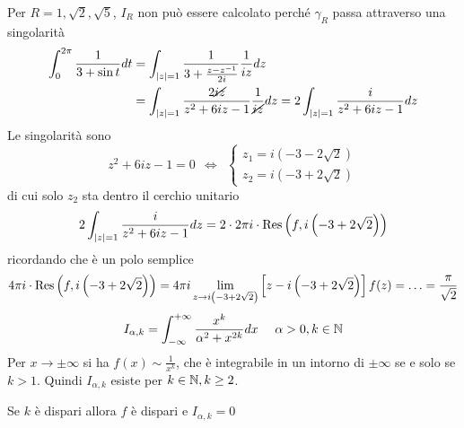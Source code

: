 Per $R = 1, \sqrt{2}, \sqrt{5}$, $I_{R}$ non può essere calcolato perché $\gamma_{R}$ passa attraverso una singolarità
\Soluzione
\begin{align*}
\int^{2\pi}_{0}\frac{1}{3 + \sin t} dt & = \int_{\left| z\right| = 1}\frac{1}{3 + \frac{z - z^{- 1}}{2i}}\frac{1}{iz} dz\\
 & = \int_{\left| z\right| = 1}\frac{2\cancel{iz}}{z^{2} + 6iz - 1}\frac{1}{\cancel{iz}} dz = 2\int_{\left| z\right| = 1}\frac{i}{z^{2} + 6iz - 1} dz
\end{align*}
Le singolarità sono
\begin{equation*}
z^{2} + 6iz - 1 = 0\ \ \iff \ \
\begin{cases}
z_{1} = i\left(- 3 - 2\sqrt{2}\right)\\
z_{2} = i\left(- 3 + 2\sqrt{2}\right)
\end{cases}
\end{equation*}
di cui solo $z_{2}$ sta dentro il cerchio unitario
\begin{equation*}
2\int_{\left| z\right| = 1}\frac{i}{z^{2} + 6iz - 1} dz = 2 \cdot 2\pi i \cdot \operatorname{Res} \left(f, i\left(- 3 + 2\sqrt{2}\right)\right)
\end{equation*}
ricordando che è un polo semplice
\begin{equation*}
4\pi i \cdot \operatorname{Res} \left(f, i\left(- 3 + 2\sqrt{2}\right)\right) = 4\pi i\lim\limits_{z\rightarrow i\left(- 3 + 2\sqrt{2}\right)}\left[ z - i\left(- 3 + 2\sqrt{2}\right)\right] f(z) = \dotsc = \frac{\pi}{\sqrt{2}}
\end{equation*}
\Soluzione
\begin{equation*}
I_{\alpha, k} = \int^{+ \infty}_{- \infty}\frac{x^{k}}{\alpha^{2} + x^{2k}} dx\ \ \ \ \alpha > 0, k\in \mathbb{N}
\end{equation*}
Per $x\rightarrow \pm \infty $ si ha $f(x) \sim \frac{1}{x^{k}}$, che è integrabile in un intorno di $\pm \infty $ se e solo se $k > 1$. Quindi $I_{\alpha, k}$ esiste per $k\in \mathbb{N}, k \geq 2$.

Se $k$ è dispari allora $f$ è dispari e $I_{\alpha, k} = 0$

